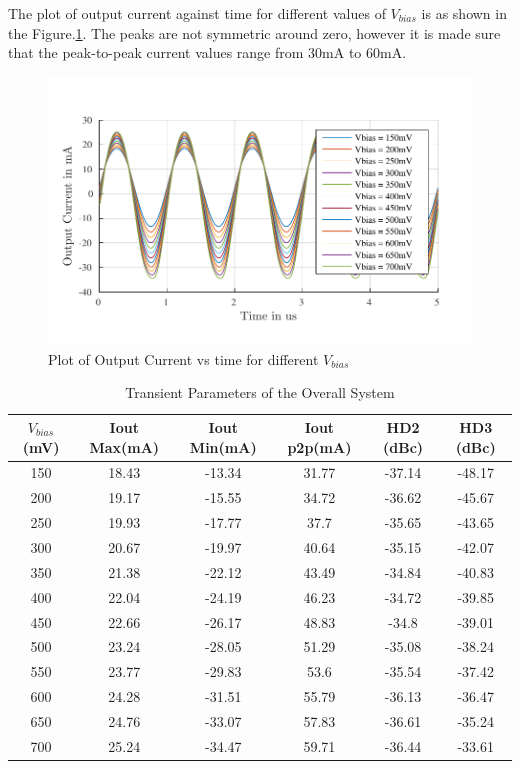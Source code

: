 The plot of output current against time for different values of $V_{bias}$ is as shown in the Figure.\ref{fig:SINE}. The peaks are not symmetric around zero, however it is made sure that the peak-to-peak current values range from 30mA to 60mA.

\begin{figure} [H]
\centering
\includegraphics[scale=1]{Figures/Plots/Ov_Sine_Iout.pdf}
\caption{Plot of Output Current vs time for different $V_{bias}$}
\label{fig:SINE}
\end{figure}

\begin{table} [H]
\centering
\begin{tabular}{@{}cccccc@{}}
\toprule
$V_{bias}$ (mV)		& Iout Max(mA)		& Iout Min(mA)	 & Iout p2p(mA) & HD2 (dBc)	&HD3 (dBc) \\ \midrule
150				& 18.43	 			& -13.34		 & 31.77		& -37.14		& -48.17	\\
200				& 19.17 			& -15.55		 & 34.72		& -36.62		& -45.67	\\
250				& 19.93 			& -17.77		 & 37.7			& -35.65		& -43.65	\\
300				& 20.67 			& -19.97		 & 40.64		& -35.15		& -42.07	\\
350				& 21.38				& -22.12		 & 43.49		& -34.84		& -40.83	\\
400				& 22.04				& -24.19		 & 46.23		& -34.72		& -39.85	\\
450				& 22.66 			& -26.17		 & 48.83		& -34.8			& -39.01	\\
500				& 23.24				& -28.05		 & 51.29		& -35.08		& -38.24	\\
550				& 23.77	 			& -29.83		 & 53.6			& -35.54		& -37.42	\\
600				& 24.28 			& -31.51		 & 55.79		& -36.13		& -36.47	\\
650				& 24.76 			& -33.07		 & 57.83		& -36.61		& -35.24	\\
700 			& 25.24 			& -34.47		 & 59.71		& -36.44		& -33.61	\\
\bottomrule
\end{tabular}
\caption{Transient Parameters of the Overall System}
\label{tab:SINE}
\end{table}

